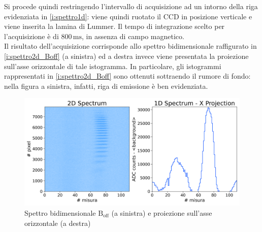 \documentclass[twocolumn,10pt]{asme2ej}
\begin{document}
Si procede quindi restringendo l'intervallo di acquisizione ad un intorno della riga evidenziata in
\autoref{i:spettro1d}: viene quindi ruotato il CCD in posizione verticale e viene inserita la lamina di Lummer. Il tempo
di integrazione scelto per l'acquisizione è di $800\,\si{\milli\second}$, in assenza di campo magnetico. \\
Il risultato dell'acquisizione corrisponde allo spettro bidimensionale raffigurato in \autoref{i:spettro2d_Boff} (a
sinistra) ed a destra invece viene presentata la proiezione sull'asse orizzontale di tale istogramma. In particolare,
gli istogrammi rappresentati in \autoref{i:spettro2d_Boff} sono ottenuti sottraendo il rumore di fondo: nella figura a
sinistra, infatti, riga di emissione è ben evidenziata. 

\begin{figure}
    \centering
    \includegraphics[width=\linewidth]{../Plots/Boff_2d_spectrum.png}
    \caption{Spettro bidimensionale $\text{B}_{\text{off}}$ (a sinistra) e proiezione sull'asse orizzontale (a destra)}
    \label{i:spettro2d_Boff}
    \vspace{-10pt}
\end{figure}
\end{document}
